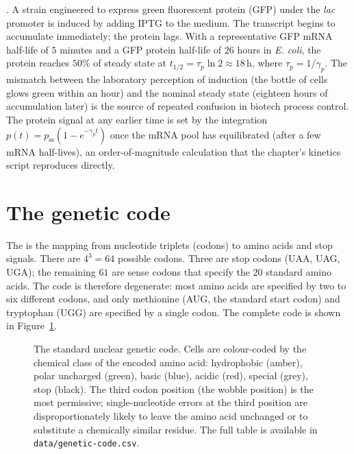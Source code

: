. A
strain engineered to express green fluorescent protein (GFP) under
the \emph{lac} promoter is induced by adding IPTG to the medium. The
transcript begins to accumulate immediately; the protein lags. With
a representative GFP mRNA half-life of $5$ minutes and a GFP protein
half-life of $26$ hours in \emph{E. coli}, the protein reaches
$50\%$ of steady state at
$t_{1/2} = \tau_p \ln 2 \approx 18\,\text{h}$, where
$\tau_p = 1/\gamma_p$. The mismatch between the laboratory perception
of induction (the bottle of cells glows green within an hour) and the
nominal steady state (eighteen hours of accumulation later) is the
source of repeated confusion in biotech process control. The protein
signal at any earlier time is set by the integration
$p(t) = p_\text{ss}(1 - e^{-\gamma_p t})$ once the mRNA pool has
equilibrated (after a few mRNA half-lives), an order-of-magnitude
calculation that the chapter's kinetics script reproduces directly.

\section{The genetic code}

The  is the mapping from nucleotide triplets
(codons) to amino acids and stop signals. There are $4^3 = 64$
possible codons. Three are stop codons (UAA, UAG, UGA); the remaining
$61$ are sense codons that specify the $20$ standard amino acids.
The code is therefore degenerate: most amino acids are specified by
two to six different codons, and only methionine (AUG, the standard
start codon) and tryptophan (UGG) are specified by a single codon.
The complete code is shown in Figure~\ref{fig:genetic-code}.

\begin{figure}[h]
\centering

\caption{The standard nuclear genetic code. Cells are colour-coded
by the chemical class of the encoded amino acid: hydrophobic
(amber), polar uncharged (green), basic (blue), acidic (red), special
(grey), stop (black). The third codon position (the wobble position)
is the most permissive; single-nucleotide errors at the third
position are disproportionately likely to leave the amino acid
unchanged or to substitute a chemically similar residue. The full
table is available in \texttt{data/genetic-code.csv}.}
\label{fig:genetic-code}
\end{figure}

